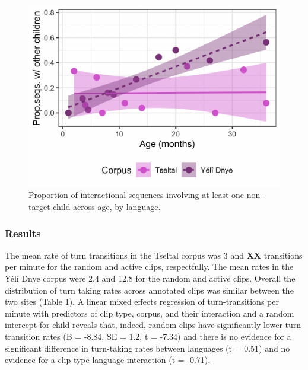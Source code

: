 \documentclass[10pt, letterpaper]{article}
\newenvironment{CodeChunk}{}{}
\begin{document}
\begin{CodeChunk}
\begin{figure}[h]

{\centering \includegraphics{figs/tseyel.is.fig-1} 

}

\caption[Proportion of interactional sequences involving at least one non-target child across age, by language]{Proportion of interactional sequences involving at least one non-target child across age, by language.}\label{fig:tseyel.is.fig}
\end{figure}
\end{CodeChunk}

\hypertarget{results}{%
\subsubsection{Results}\label{results}}

The mean rate of turn transitions in the Tseltal corpus was 3 and
\textbf{XX} transitions per minute for the random and active clips,
respectfully. The mean rates in the Yélî Dnye corpus were 2.4 and 12.8
for the random and active clips. Overall the distribution of turn taking
rates across annotated clips was similar between the two sites (Table
1). A linear mixed effects regression of turn-transitions per minute
with predictors of clip type, corpus, and their interaction and a random
intercept for child reveals that, indeed, random clips have
significantly lower turn-transition rates (B = -8.84, SE = 1.2, t =
-7.34) and there is no evidence for a significant difference in
turn-taking rates between languages (t = 0.51) and no evidence for a
clip type-language interaction (t = -0.71).
\end{document}
